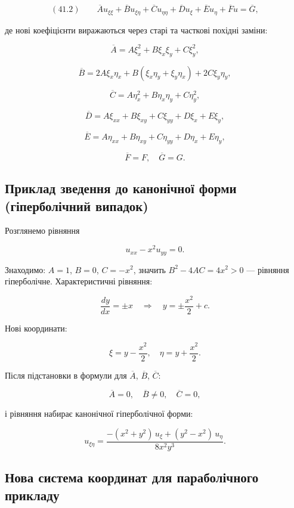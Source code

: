 \documentclass[
  ukrainian,
]{article}
\begin{document}
\[(41.2)\qquad\overline{A} u_{\xi\xi} + \overline{B} u_{\xi\eta} + \overline{C} u_{\eta\eta} + \overline{D} u_{\xi} + \overline{E} u_{\eta} + \overline{F} u = \overline{G},\]

де нові коефіцієнти виражаються через старі та часткові похідні заміни:

\[\overline{A} = A\xi_x^2 + B\xi_x\xi_y + C\xi_y^2,\]

\[\overline{B} = 2A\xi_x\eta_x + B(\xi_x\eta_y + \xi_y\eta_x) + 2C\xi_y\eta_y,\]

\[\overline{C} = A\eta_x^2 + B\eta_x\eta_y + C\eta_y^2,\]

\[\overline{D} = A\xi_{xx} + B\xi_{xy} + C\xi_{yy} + D\xi_x + E\xi_y,\]

\[\overline{E} = A\eta_{xx} + B\eta_{xy} + C\eta_{yy} + D\eta_x + E\eta_y,\]

\[\overline{F} = F, \quad \overline{G} = G.\]

\subsection{Приклад зведення до канонічної форми (гіперболічний
випадок)}\label{ux43fux440ux438ux43aux43bux430ux434-ux437ux432ux435ux434ux435ux43dux43dux44f-ux434ux43e-ux43aux430ux43dux43eux43dux456ux447ux43dux43eux457-ux444ux43eux440ux43cux438-ux433ux456ux43fux435ux440ux431ux43eux43bux456ux447ux43dux438ux439-ux432ux438ux43fux430ux434ux43eux43a}

Розглянемо рівняння

\[u_{xx} - x^2 u_{yy} = 0.\]

Знаходимо: \(A = 1\), \(B = 0\), \(C = -x^2\), значить
\(B^2 - 4AC = 4x^2 > 0\) --- рівняння гіперболічне. Характеристичні
рівняння:

\[\frac{dy}{dx} = \pm x \quad \Rightarrow \quad y = \pm \frac{x^2}{2} + c.\]

Нові координати:

\[\xi = y - \frac{x^2}{2}, \quad \eta = y + \frac{x^2}{2}.\]

Після підстановки в формули для \(\overline{A}\), \(\overline{B}\),
\(\overline{C}\):

\[\overline{A} = 0, \quad \overline{B} \neq 0, \quad \overline{C} = 0,\]

і рівняння набирає канонічної гіперболічної форми:

\[u_{\xi\eta} = \frac{-(x^2+y^2)\,u_\xi + (y^2-x^2)\,u_\eta}{8x^2 y^3}.\]

\subsection{Нова система координат для параболічного
прикладу}\label{ux43dux43eux432ux430-ux441ux438ux441ux442ux435ux43cux430-ux43aux43eux43eux440ux434ux438ux43dux430ux442-ux434ux43bux44f-ux43fux430ux440ux430ux431ux43eux43bux456ux447ux43dux43eux433ux43e-ux43fux440ux438ux43aux43bux430ux434ux443}
\end{document}
